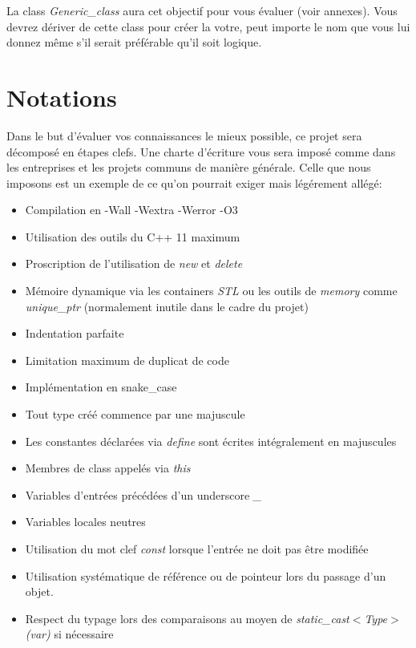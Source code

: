 \documentclass[9pts]{article}
\begin{document}
La class \emph{Generic\_class} aura cet objectif pour vous évaluer (voir annexes).
Vous devrez dériver de cette class pour créer la votre, peut importe le nom que vous lui donnez même s'il serait préférable qu'il soit logique.


\section{Notations}
Dans le but d'évaluer vos connaissances le mieux possible, ce projet sera décomposé en étapes clefs.
Une charte d'écriture vous sera imposé comme dans les entreprises et les projets communs de manière générale.
Celle que nous imposons est un exemple de ce qu'on pourrait exiger mais légérement allégé:\\
\begin{itemize}
\item Compilation en -Wall -Wextra -Werror -O3
\item Utilisation des outils du C++ 11 maximum
\item Proscription de l'utilisation de \emph{new} et \emph{delete}
\item Mémoire dynamique via les containers \emph{STL} ou les outils de \emph{memory} comme \emph{unique\_ptr} (normalement inutile dans le cadre du projet)
\item Indentation parfaite
\item Limitation maximum de duplicat de code
\item Implémentation en snake\_case
\item Tout type créé commence par une majuscule
\item Les constantes déclarées via \emph{define} sont écrites intégralement en majuscules
\item Membres de class appelés via \emph{this}
\item Variables d'entrées précédées d'un underscore \emph{\_}
\item Variables locales neutres
\item Utilisation du mot clef \emph{const} lorsque l'entrée ne doit pas être modifiée
\item Utilisation systématique de référence ou de pointeur lors du passage d'un objet.
\item Respect du typage lors des comparaisons au moyen de \emph{static\_cast$<$Type$>$(var)} si nécessaire
\end{itemize}
\end{document}
